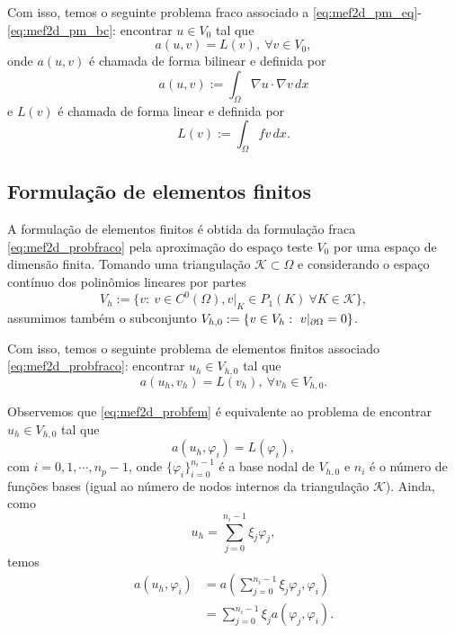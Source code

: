 Com isso, temos o seguinte problema fraco associado a \eqref{eq:mef2d_pm_eq}-\eqref{eq:mef2d_pm_bc}: encontrar $u\in V_0$ tal que
\begin{equation}\label{eq:mef2d_probfraco}
  a(u,v) = L(v),~\forall v\in V_0,
\end{equation}
onde $a(u, v)$ é chamada de forma bilinear e definida por
\begin{equation}
  a(u,v) := \int_\Omega \nabla u\cdot\nabla v\,dx
\end{equation}
e $L(v)$ é chamada de forma linear e definida por
\begin{equation}
  L(v) := \int_\Omega fv\,dx.
\end{equation}

\subsection{Formulação de elementos finitos}
\badgeRevisar

A formulação de elementos finitos é obtida da formulação fraca \eqref{eq:mef2d_probfraco} pela aproximação do espaço teste $V_0$ por uma espaço de dimensão finita. Tomando uma triangulação $\mathcal{K}\subset\Omega$ e considerando o espaço contínuo dos polinômios lineares por partes
\begin{equation}
  V_h := \{v:~v\in C^0(\Omega), v|_K\in P_1(K)~\forall K\in\mathcal{K}\},
\end{equation}
assumimos também o subconjunto $V_{h,0}:= \{v\in V_h:~v|_{\partial\Omega}=0\}$.

Com isso, temos o seguinte problema de elementos finitos associado \eqref{eq:mef2d_probfraco}: encontrar $u_h\in V_{h,0}$ tal que
\begin{equation}\label{eq:mef2d_probfem}
  a(u_h,v_h) = L(v_h),~\forall v_h\in V_{h,0}.
\end{equation}

Observemos que \eqref{eq:mef2d_probfem} é equivalente ao problema de encontrar $u_h\in V_{h,0}$ tal que
\begin{equation}\label{eq:mef2d_proba1}
  a(u_h,\varphi_i) = L(\varphi_i),
\end{equation}
com $i=0, 1, \cdots, n_p-1$, onde $\{\varphi_i\}_{i=0}^{n_i-1}$ é a base nodal de $V_{h,0}$ e $n_i$ é o número de funções bases (igual ao número de nodos internos da triangulação $\mathcal{K}$). Ainda, como
\begin{equation}
  u_h = \sum_{j=0}^{n_i-1} \xi_j\varphi_j,
\end{equation}
temos 
\begin{align}
  a(u_h, \varphi_i) &= a\left(\sum_{j=0}^{n_i-1}\xi_j\varphi_j,\varphi_i\right) \\
  &= \sum_{j=0}^{n_i-1}\xi_ja(\varphi_j,\varphi_i).
\end{align}

